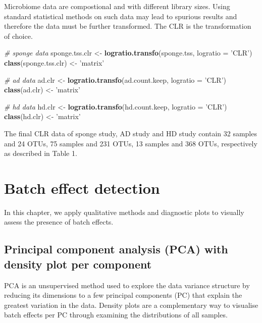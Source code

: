 \documentclass[]{book}
\newenvironment{Shaded}{\begin{snugshade}}{\end{snugshade}}
\newcommand{\KeywordTok}[1]{\textcolor[rgb]{0.13,0.29,0.53}{\textbf{#1}}}
\newcommand{\DataTypeTok}[1]{\textcolor[rgb]{0.13,0.29,0.53}{#1}}
\newcommand{\StringTok}[1]{\textcolor[rgb]{0.31,0.60,0.02}{#1}}
\newcommand{\CommentTok}[1]{\textcolor[rgb]{0.56,0.35,0.01}{\textit{#1}}}
\newcommand{\NormalTok}[1]{#1}
\begin{document}
Microbiome data are compostional and with different library sizes. Using
standard statistical methods on such data may lead to spurious results
and therefore the data must be further transformed. The CLR is the
transformation of choice.

\begin{Shaded}
\begin{Highlighting}[]
\CommentTok{# sponge data}
\NormalTok{sponge.tss.clr <-}\StringTok{ }\KeywordTok{logratio.transfo}\NormalTok{(sponge.tss, }\DataTypeTok{logratio =} \StringTok{'CLR'}\NormalTok{)}
\KeywordTok{class}\NormalTok{(sponge.tss.clr) <-}\StringTok{ 'matrix'} 

\CommentTok{# ad data}
\NormalTok{ad.clr <-}\StringTok{ }\KeywordTok{logratio.transfo}\NormalTok{(ad.count.keep, }\DataTypeTok{logratio =} \StringTok{'CLR'}\NormalTok{)}
\KeywordTok{class}\NormalTok{(ad.clr) <-}\StringTok{ 'matrix'} 

\CommentTok{# hd data}
\NormalTok{hd.clr <-}\StringTok{ }\KeywordTok{logratio.transfo}\NormalTok{(hd.count.keep, }\DataTypeTok{logratio =} \StringTok{'CLR'}\NormalTok{)}
\KeywordTok{class}\NormalTok{(hd.clr) <-}\StringTok{ 'matrix'}
\end{Highlighting}
\end{Shaded}

The final CLR data of sponge study, AD study and HD study contain 32
samples and 24 OTUs, 75 samples and 231 OTUs, 13 samples and 368 OTUs,
respectively as described in Table 1.

\chapter{Batch effect detection}\label{detect}

In this chapter, we apply qualitative methods and diagnostic plots to
visually assess the presence of batch effects.

\section{Principal component analysis (PCA) with density plot per
component}\label{principal-component-analysis-pca-with-density-plot-per-component}

PCA is an unsupervised method used to explore the data variance
structure by reducing its dimensions to a few principal components (PC)
that explain the greatest variation in the data. Density plots are a
complementary way to visualise batch effects per PC through examining
the distributions of all samples.
\end{document}
